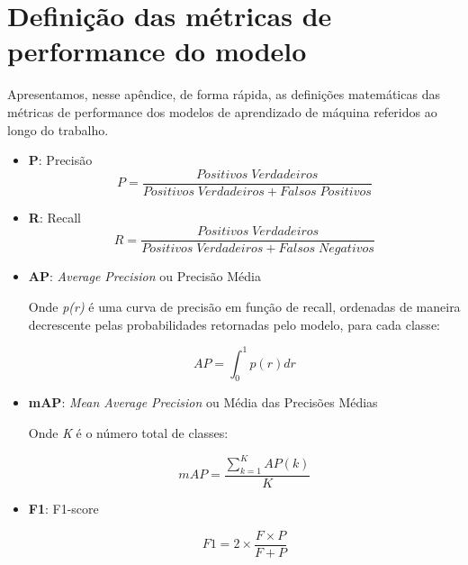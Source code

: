 \documentclass[]{politex}
\begin{document}


\apendice{}
\chapter{Definição das métricas de performance do modelo}

Apresentamos, nesse apêndice, de forma rápida, as definições matemáticas das métricas de performance dos modelos de aprendizado de máquina referidos ao longo do trabalho.

\begin{itemize}
    \item \textbf{P}: Precisão
    \begin{equation}
        P = \frac{Positivos\; Verdadeiros}{Positivos\; Verdadeiros + Falsos\; Positivos}
    \end{equation}
    
    \item \textbf{R}: Recall
    \begin{equation}
        R = \frac{Positivos\; Verdadeiros}{Positivos\; Verdadeiros + Falsos\; Negativos}
    \end{equation}
    
    \item \textbf{AP}: \textit{Average Precision} ou Precisão Média
    
    Onde \textit{p(r)} é uma curva de precisão em função de recall, ordenadas de maneira decrescente pelas probabilidades retornadas pelo modelo, para cada classe:
    
    \begin{equation}
        AP = \int_{0}^{1}p(r)dr
    \end{equation}
    
    \item \textbf{mAP}: \textit{Mean Average Precision} ou Média das Precisões Médias
    
    Onde \textit{K} é o número total de classes:
    
    \begin{equation}
        mAP = \frac{\sum_{k=1}^{K} AP(k)}{K}
    \end{equation}
    
    \item \textbf{F1}: F1-score
    
    \begin{equation}
        F1 = 2 \times \frac{F \times P}{F + P}
    \end{equation}
    

\end{itemize}
\end{document}
